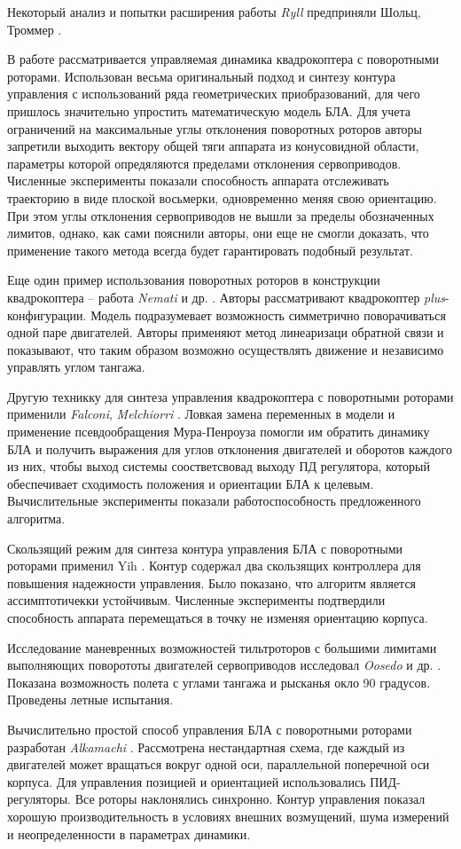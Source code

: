 Некоторый анализ и попытки расширения работы \textit{Ryll} предприняли Шольц, Троммер \cite{Stolc01}.

В работе  \cite{Invernizzi01} рассматривается управляемая динамика квадрокоптера с поворотными роторами. Использован весьма оригинальный подход  и синтезу контура управления с использований ряда геометрических приобразований, для чего пришлось значительно упростить математическую модель БЛА. Для учета ограничений на максимальные углы отклонения поворотных роторов авторы запретили выходить вектору общей тяги аппарата из конусовидной области, параметры которой опредяляются пределами отклонения сервоприводов. Численные эксперименты показали способность аппарата отслеживать траекторию в виде плоской восьмерки, одновременно меняя свою ориентацию. При этом углы отклонения сервоприводов не вышли за пределы обозначенных лимитов, однако, как сами пояснили авторы, они еще не смогли доказать, что применение такого метода всегда будет гарантировать подобный результат.

Еще один пример использования поворотных роторов в конструкции квадрокоптера -- работа \textit{Nemati} и др. \cite{Nemati01}. Авторы рассматривают квадрокоптер \textit{plus}-конфигурации. Модель подразумевает возможность симметрично поворачиваться одной паре двигателей. Авторы применяют метод линеаризаци обратной связи и показывают, что таким образом возможно осуществлять движение и независимо управлять углом тангажа.

Другую техникку для синтеза управления квадрокоптера с поворотными роторами применили \textit{Falconi}, \textit{Melchiorri} \cite{Falconi01}. Ловкая замена переменных в модели и применение псевдообращения Мура-Пенроуза помогли им обратить динамику БЛА и получить выражения для углов отклонения двигателей и оборотов каждого из них, чтобы выход системы соостветсвовад выходу ПД регулятора, который обеспечивает сходимость положения и ориентации БЛА к целевым. Вычислительные эксперименты показали работоспособность предложенного алгоритма.

Скользящий режим для синтеза контура управления БЛА с поворотными роторами применил Yih \cite{Yih01}. Контур содержал два скользящих контроллера для повышения надежности управления. Было показано, что алгоритм является ассимптотичекки устойчивым. Численные эксперименты подтвердили способность аппарата перемещаться в точку не изменяя ориентацию корпуса.

Исследование маневренных возможностей тильтроторов с большими лимитами выполняющих поворототы двигателей сервоприводов исследовал \textit{Oosedo} и др. \cite{Oosedo01}. Показана возможность полета с углами тангажа и рысканья окло 90 градусов. Проведены летные испытания.

Вычислительно простой способ управления БЛА с поворотными роторами разработан \textit{Alkamachi} \cite{Alkamachi01}. Рассмотрена нестандартная схема, где каждый из двигателей может вращаться вокруг одной оси, параллельной поперечной оси корпуса. Для управления позицией и ориентацией использовались ПИД-регуляторы. Все роторы наклонялись синхронно. Контур управления показал хорошую производительность в условиях внешних возмущений, шума измерений и неопределенности в параметрах динамики.

